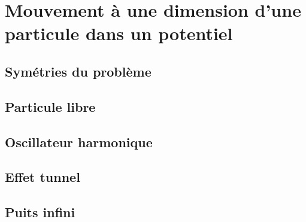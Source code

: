 \section{Mouvement à une dimension d’une particule dans un potentiel}

    \subsection{Symétries du problème}

    \subsection{Particule libre}

    \subsection{Oscillateur harmonique}

    \subsection{Effet tunnel}

    \subsection{Puits infini}